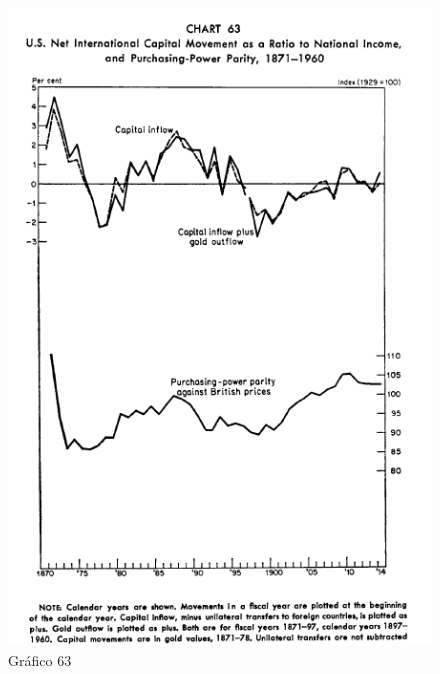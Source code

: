 \documentclass[a4paper,12pt]{article}[abntex2]
\begin{document}
\begin{figure}[H]
    \centering
    \caption{Gráfico 63}
    \includegraphics[width=1.0\textwidth]{4º Período/História do Pensamento Econômico/Tradução HPE/Tradução Tópico 9.1/Gráfico 63.png}
    \end{figure}
\end{document}
